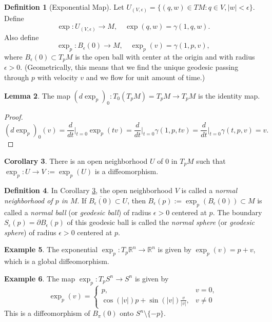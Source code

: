 \documentclass{amsart}
\numberwithin{equation}{section}
\newcommand{\bR}{\mathbb{R}}
\theoremstyle{definition}
\newtheorem{definition}{Definition} [section]
\newtheorem{example}[definition]{Example}
\theoremstyle{theorem}
\newtheorem{corollary}[definition]{Corollary}
\newtheorem{lemma}[definition]{Lemma}
\begin{document}
\begin{definition}[Exponential Map]
Let $U_{(V,\epsilon)} = \{(q, w) \in TM : q \in V, |w| < \epsilon\}$. Define 
$$
\exp : U_{(V,\epsilon)} \longrightarrow M,\quad \exp(q,w)=\gamma(1, q, w).
$$
Also define 
$$
\exp_p : B_\epsilon(0) \longrightarrow  M,\quad \exp_p(v) = \gamma(1,p,v),
$$
where $B_\epsilon(0)\subset T_pM$ is the open ball with center at the origin and with radius $\epsilon>0$. 
(Geometrically, this means that we find the unique geodesic passing through $p$ with velocity $v$ and we flow for unit amount of time.) 
\end{definition}

\begin{lemma}
The map $(d \exp_p)_0 : T_0(T_pM)= T_pM \to T_pM$ is the identity map.
\end{lemma}

\begin{proof}
$$
(d \exp_p)_0(v) = \frac{d}{dt}\Big|_{t=0} \exp_p(tv) 
= \frac{d}{dt}\Big|_{t=0} \gamma(1, p, tv) 
= \frac{d}{dt}\Big|_{t=0} \gamma(t, p, v) = v.
$$ 
\end{proof}

\begin{corollary}\label{exp-diffeo}
There is an open neighborhood $U$ of $0$ in $T_pM$ such that $\exp_p : U \to V := \exp_p(U)$ is a diffeomorphism. 
\end{corollary}

\begin{definition}
In Corollary \ref{exp-diffeo}, the open neighborhood $V$ is called a {\em normal neighborhood of $p$ in $M$}.  
If $\overline{B_\epsilon(0)} \subset U$, then $B_\epsilon(p) := \exp_p(B_\epsilon(0)) \subset M$ is called a {\em normal ball} (or {\em geodesic ball}) 
of radius $\epsilon > 0$ centered at $p$. The boundary $S_\epsilon(p)=\partial B_\epsilon(p)$ of this geodesic ball is called the {\em normal sphere}
(or {\em geodesic sphere}) of radius $\epsilon>0$ centered at $p$. 
\end{definition}

\begin{example}
The exponential $\exp_p : T_p\bR^n \to \bR^n$ is given by $\exp_p(v) = p + v$, which is a global diffeomorphism. 
\end{example}

\begin{example}
The map $\exp_p : T_pS^n \to S^n$ is given by 
\[
\exp_p(v) = \begin{cases}
p, & v=0,\\
\cos(|v|)p + \sin(|v|)\frac{v}{|v|}, & v\neq 0
\end{cases}
\]
This is a diffeomorphism of $B_\pi(0)$ onto $S^n \setminus \{-p\}$.  
\end{example}
\end{document}
